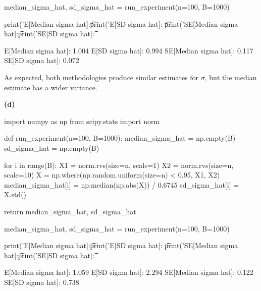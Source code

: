 \begin{python}
median_sigma_hat, sd_sigma_hat = run_experiment(n=100, B=1000)
\end{python}

\begin{python}
print('E[Median sigma hat]:\t %
print('E[SD sigma hat]:   \t %

print('SE[Median sigma hat]:\t %
print('SE[SD sigma hat]:\t %
\end{python}

\begin{console}
E[Median sigma hat]:     1.004
E[SD sigma hat]:         0.994
SE[Median sigma hat]:    0.117
SE[SD sigma hat]:        0.072
\end{console}

As expected, both methodologies produce similar estimates for
\(\sigma\), but the median estimate has a wider variance.

\textbf{(d)}

\begin{python}
import numpy as np
from scipy.stats import norm

def run_experiment(n=100, B=1000):
    median_sigma_hat = np.empty(B)
    sd_sigma_hat = np.empty(B)
    
    for i in range(B):
        X1 = norm.rvs(size=n, scale=1)
        X2 = norm.rvs(size=n, scale=10)
        X = np.where(np.random.uniform(size=n) < 0.95, X1, X2)
        median_sigma_hat[i] = np.median(np.abs(X)) / 0.6745
        sd_sigma_hat[i] = X.std()
    
    return median_sigma_hat, sd_sigma_hat
\end{python}

\begin{python}
median_sigma_hat, sd_sigma_hat = run_experiment(n=100, B=1000)
\end{python}

\begin{python}
print('E[Median sigma hat]:\t %
print('E[SD sigma hat]:   \t %

print('SE[Median sigma hat]:\t %
print('SE[SD sigma hat]:\t %
\end{python}

\begin{console}
E[Median sigma hat]:     1.059
E[SD sigma hat]:         2.294
SE[Median sigma hat]:    0.122
SE[SD sigma hat]:        0.738
\end{console}


